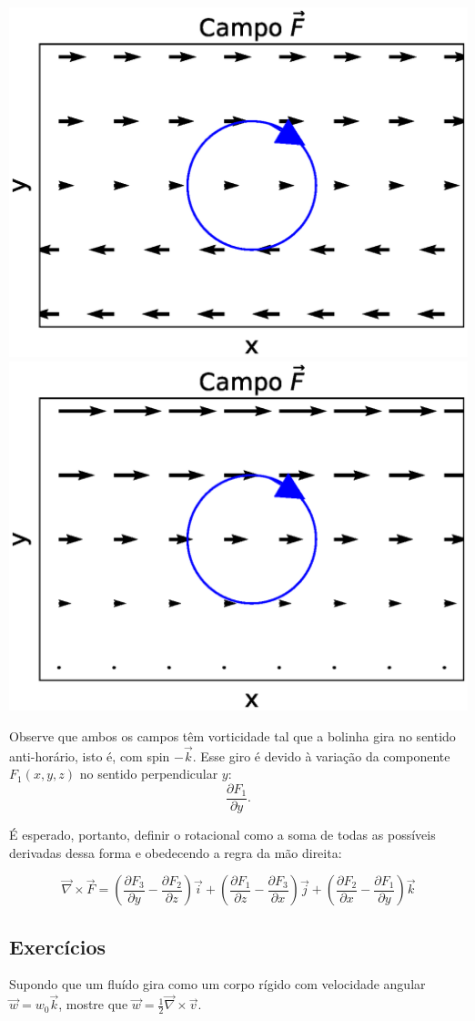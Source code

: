 \begin{center}\includegraphics[width=.5\textwidth]{cap_campos/figs/campo_com_bolinha_rotacional_1}\includegraphics[width=.5\textwidth]{cap_campos/figs/campo_com_bolinha_rotacional_2}\end{center}

Observe que ambos os campos têm vorticidade tal que a bolinha gira no sentido anti-horário, isto é, com spin $-\vec{k}$. Esse giro é devido à variação da componente $F_1(x,y,z)$ no sentido perpendicular $y$:
$$\frac{\partial F_1}{\partial y}. $$

É esperado, portanto, definir o rotacional como a soma de todas as possíveis derivadas dessa forma e obedecendo a regra da mão direita:

$$\vec{\nabla}\times \vec{F} = \left(\frac{\partial F_3}{\partial y} - \frac{\partial F_2}{\partial z}\right) \vec{i} + \left(\frac{\partial F_1}{\partial z} - \frac{\partial F_3}{\partial x} \right) \vec{j} + \left(\frac{\partial F_2}{\partial x} - \frac{\partial F_1}{\partial y} \right) \vec{k}$$


\subsection*{Exercícios}
\begin{exer}
Supondo que um fluído gira como um corpo rígido com velocidade angular $\vec{w}=w_0\vec{k}$, mostre que $\vec{w}=\frac{1}{2}\vec{\nabla}\times \vec{v}$.
\end{exer}

